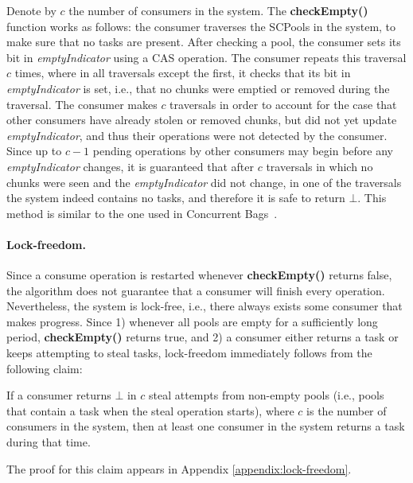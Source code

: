 Denote by $c$ the number of consumers in the system. The {\bf checkEmpty()} function works as follows: the consumer traverses the SCPools in the system, to make sure that no tasks are present. After checking a pool, the consumer sets its bit in \emph{emptyIndicator} using a CAS operation. The consumer repeats this traversal $c$ times, where in all traversals except the first, it checks that its bit in \emph{emptyIndicator} is set, i.e., that no chunks were emptied or removed during the traversal. The consumer makes $c$ traversals in order to account for the case that other consumers have already stolen or removed chunks, but did not yet update \emph{emptyIndicator}, and thus their operations were not detected by the consumer. Since up to $c-1$ pending operations by other consumers may begin before any \emph{emptyIndicator} changes, it is guaranteed that after $c$ traversals in which no chunks were seen and the \emph{emptyIndicator} did not change, in one of the traversals the system indeed contains no tasks, and therefore it is safe to return $\bot$. This method is similar to the one used in Concurrent Bags~\cite{Sundell:2011:LAC:1989493.1989550}.
\paragraph{Lock-freedom.}
Since a consume operation is restarted whenever {\bf checkEmpty()} returns false, the algorithm does not guarantee that a consumer will finish every operation. Nevertheless, the system is lock-free, i.e., there always exists some consumer that makes progress. Since 1) whenever all pools are empty for a sufficiently long period, {\bf checkEmpty()} returns true, and 2) a consumer either returns a task or keeps attempting to steal tasks, lock-freedom immediately follows from the following claim:

\begin{claim}
\label{claim:lock-free}
If a consumer returns $\bot$ in $c$ steal attempts from non-empty pools (i.e., pools that contain a task when the steal operation starts), where $c$ is the number of consumers in the system, then at least one consumer in the system returns a task during that time. 
\end{claim}
The proof for this claim appears in Appendix \ref{appendix:lock-freedom}.